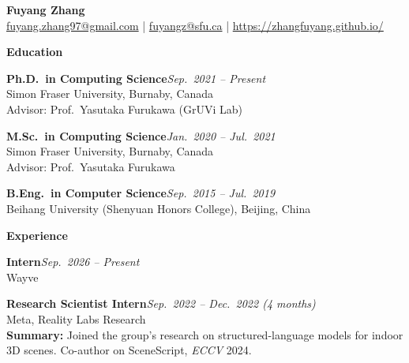 \documentclass[10pt]{article}
\newcommand{\cvsec}[1]{%
  \vspace{1.05em}%
  {\large\bfseries #1\par}%
  \vspace{1pt}{\color{black!40}\rule{\textwidth}{0.45pt}}%
  \vspace{0.12em}%
}
\newcommand{\cvline}[2]{\textbf{#1}\hfill\textit{#2}\\}
\begin{document}
\begin{center}
{\LARGE\textbf{Fuyang Zhang}} \\[0.4em]
{\small
\href{mailto:fuyang.zhang97@gmail.com}{fuyang.zhang97@gmail.com}
\quad|\quad
\href{mailto:fuyangz@sfu.ca}{fuyangz@sfu.ca}
\quad|\quad
\url{https://zhangfuyang.github.io/}
}
\end{center}
\vspace{0.35em}

\cvsec{Education}
\cvline{Ph.D.\ in Computing Science}{Sep.\ 2021 -- Present}
Simon Fraser University, Burnaby, Canada\\
Advisor: Prof.\ Yasutaka Furukawa (GrUVi Lab)
\vspace{0.55em}

\cvline{M.Sc.\ in Computing Science}{Jan.\ 2020 -- Jul.\ 2021}
Simon Fraser University, Burnaby, Canada\\
Advisor: Prof.\ Yasutaka Furukawa
\vspace{0.55em}

\cvline{B.Eng.\ in Computer Science}{Sep.\ 2015 -- Jul.\ 2019}
Beihang University (Shenyuan Honors College), Beijing, China\\

\cvsec{Experience}
\cvline{Intern}{Sep.\ 2026 -- Present}
Wayve
\vspace{0.55em}

\cvline{Research Scientist Intern}{Sep.\ 2022 -- Dec.\ 2022 (4 months)}
Meta, Reality Labs Research\\
{\small
\textbf{Summary:} Joined the group's research on structured-language models for indoor 3D scenes. Co-author on SceneScript, \textit{ECCV} 2024.
}
\end{document}
